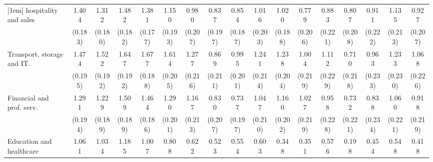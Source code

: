 {\begin{tabular}{l*{16}{c}}
[1em]
hospitality and sales&       1.404\sym{***}&       1.312\sym{***}&       1.482\sym{***}&       1.381\sym{***}&       1.150\sym{***}&       0.980\sym{***}&       0.837\sym{***}&       0.854\sym{***}&       1.016\sym{***}&       1.020\sym{***}&       0.779\sym{***}&       0.883\sym{***}&       0.807\sym{***}&       0.911\sym{***}&       1.135\sym{***}&       0.927\sym{***}\\
                    &     (0.183)         &     (0.180)         &     (0.182)         &     (0.177)         &     (0.193)         &     (0.207)         &     (0.197)         &     (0.187)         &     (0.203)         &     (0.188)         &     (0.206)         &     (0.221)         &     (0.208)         &     (0.222)         &     (0.213)         &     (0.207)         \\
[1em]
Transport, storage and IT.&       1.474\sym{***}&       1.522\sym{***}&       1.647\sym{***}&       1.677\sym{***}&       1.614\sym{***}&       1.277\sym{***}&       0.869\sym{***}&       0.995\sym{***}&       1.241\sym{***}&       1.238\sym{***}&       1.004\sym{***}&       1.112\sym{***}&       0.710\sym{**} &       0.963\sym{***}&       1.233\sym{***}&       1.068\sym{***}\\
                    &     (0.195)         &     (0.192)         &     (0.192)         &     (0.188)         &     (0.205)         &     (0.216)         &     (0.211)         &     (0.201)         &     (0.214)         &     (0.204)         &     (0.219)         &     (0.229)         &     (0.218)         &     (0.233)         &     (0.230)         &     (0.226)         \\
[1em]
Financial and prof. serv.&       1.291\sym{***}&       1.229\sym{***}&       1.509\sym{***}&       1.464\sym{***}&       1.290\sym{***}&       1.167\sym{***}&       0.830\sym{***}&       0.737\sym{***}&       1.047\sym{***}&       1.160\sym{***}&       1.027\sym{***}&       0.958\sym{***}&       0.732\sym{***}&       0.838\sym{***}&       1.060\sym{***}&       0.918\sym{***}\\
                    &     (0.194)         &     (0.189)         &     (0.189)         &     (0.186)         &     (0.201)         &     (0.213)         &     (0.207)         &     (0.197)         &     (0.210)         &     (0.202)         &     (0.219)         &     (0.228)         &     (0.221)         &     (0.234)         &     (0.221)         &     (0.219)         \\
[1em]
Education and healthcare&       1.061\sym{***}&       1.034\sym{***}&       1.185\sym{***}&       1.007\sym{***}&       0.808\sym{***}&       0.622\sym{**} &       0.523\sym{*}  &       0.554\sym{*}  &       0.603\sym{**} &       0.348         &       0.351         &       0.576\sym{*}  &       0.198         &       0.454         &       0.548\sym{*}  &       0.418         \\

\end{tabular}}
